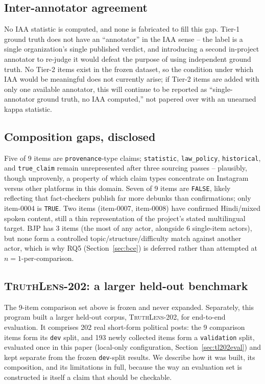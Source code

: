 \documentclass[conference]{IEEEtran}
\begin{document}
\subsection{Inter-annotator agreement}
No IAA statistic is computed, and none is fabricated to fill this gap.
Tier-1 ground truth does not have an ``annotator'' in the IAA sense -- the
label is a single organization's single published verdict, and
introducing a second in-project annotator to re-judge it would defeat the
purpose of using independent ground truth. No Tier-2 items exist in the
frozen dataset, so the condition under which IAA would be meaningful does
not currently arise; if Tier-2 items are added with only one available
annotator, this will continue to be reported as ``single-annotator ground
truth, no IAA computed,'' not papered over with an unearned kappa
statistic.

\subsection{Composition gaps, disclosed}
\label{sec:datasetgaps}
Five of 9 items are \texttt{provenance}-type claims; \texttt{statistic},
\texttt{law\_policy}, \texttt{historical}, and \texttt{true\_claim} remain
unrepresented after three sourcing passes -- plausibly, though unprovenly,
a property of which claim types concentrate on Instagram versus other
platforms in this domain. Seven of 9 items are \texttt{FALSE}, likely
reflecting that fact-checkers publish far more debunks than confirmations;
only item-0004 is \texttt{TRUE}. Two items (item-0007, item-0008) have
confirmed Hindi/mixed spoken content, still a thin representation of the
project's stated multilingual target. BJP has 3 items (the most of any
actor, alongside 6 single-item actors), but none form a controlled
topic/structure/difficulty match against another actor, which is why RQ5
(Section~\ref{sec:bce}) is deferred rather than attempted at
$n=1$-per-comparison.

\subsection{\textsc{TruthLens-202}: a larger held-out benchmark}
\label{sec:truthlens202}

The 9-item comparison set above is frozen and never expanded. Separately,
this program built a larger held-out corpus, \textsc{TruthLens-202}, for
end-to-end evaluation. It comprises 202 real short-form political
posts: the 9 comparison items form its \texttt{dev} split, and 193 newly
collected items form a \texttt{validation} split, evaluated once in this
paper (local-only configuration, Section~\ref{sec:tl202eval}) and kept
separate from the frozen \texttt{dev}-split results. We describe how it
was built, its composition, and its limitations in full, because the way
an evaluation set is constructed is itself a claim that should be
checkable.
\end{document}

